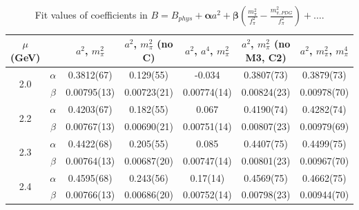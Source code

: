\documentclass[12pt]{extarticle}
\begin{document}
\begin{table}[h!]
\begin{center}
\begin{tabular}{|c c|c|c|c|c|c|}
\hline
$\mu$ (GeV) &  & $a^2$, $m_\pi^2$& $a^2$, $m_\pi^2$ (no C)& $a^2$, $a^4$, $m_\pi^2$& $a^2$, $m_\pi^2$ (no M3, C2)& $a^2$, $m_\pi^2$, $m_\pi^4$\\
\hline
\multirow{2}{0.5in}{2.0} & $\alpha$ & 0.3812(67)& 0.129(55)& -0.034& 0.3807(73)& 0.3879(73)\\
 & $\beta$ & 0.00795(13)& 0.00723(21)& 0.00774(14)& 0.00824(23)& 0.00978(70)\\
\hline
\multirow{2}{0.5in}{2.2} & $\alpha$ & 0.4203(67)& 0.182(55)& 0.067& 0.4190(74)& 0.4282(74)\\
 & $\beta$ & 0.00767(13)& 0.00690(21)& 0.00751(14)& 0.00807(23)& 0.00979(69)\\
\hline
\multirow{2}{0.5in}{2.3} & $\alpha$ & 0.4422(68)& 0.205(55)& 0.085& 0.4407(75)& 0.4499(75)\\
 & $\beta$ & 0.00764(13)& 0.00687(20)& 0.00747(14)& 0.00801(23)& 0.00967(70)\\
\hline
\multirow{2}{0.5in}{2.4} & $\alpha$ & 0.4595(68)& 0.243(56)& 0.17(14)& 0.4569(75)& 0.4662(75)\\
 & $\beta$ & 0.00766(13)& 0.00686(20)& 0.00752(14)& 0.00798(23)& 0.00944(70)\\
\hline
\end{tabular}
\caption{Fit values of coefficients in $B = B_{phys} + \mathbf{\alpha} a^2 + \mathbf{\beta}\left(\frac{m_\pi^2}{f_\pi^2}-\frac{m_{\pi,PDG}^2}{f_\pi^2}\right) + \ldots$.}
\end{center}
\end{table}




















\clearpage
\end{document}
